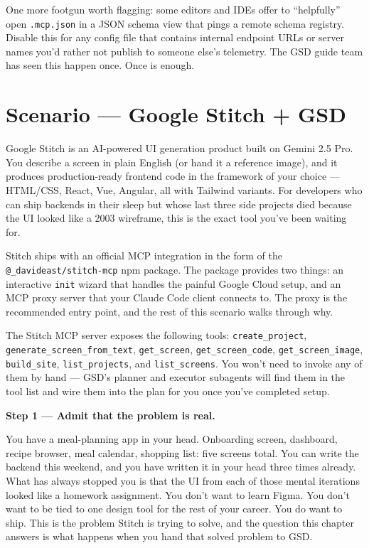 \documentclass[11pt,letterpaper,openany]{book}
\begin{document}
One more footgun worth flagging: some editors and IDEs offer to
``helpfully'' open \texttt{.mcp.json} in a JSON schema view that pings a
remote schema registry. Disable this for any config file that contains
internal endpoint URLs or server names you'd rather not publish to
someone else's telemetry. The GSD guide team has seen this happen once.
Once is enough.

\chapter{Scenario --- Google Stitch + GSD}

\begin{gsdscenario}

Google Stitch is an AI-powered UI generation product built on Gemini 2.5
Pro. You describe a screen in plain English (or hand it a reference
image), and it produces production-ready frontend code in the framework
of your choice --- HTML/CSS, React, Vue, Angular, all with Tailwind
variants. For developers who can ship backends in their sleep but whose
last three side projects died because the UI looked like a 2003
wireframe, this is the exact tool you've been waiting for.

Stitch ships with an official MCP integration in the form of the
\texttt{@\_davideast/stitch-mcp} npm package. The package provides two
things: an interactive \texttt{init} wizard that handles the painful
Google Cloud setup, and an MCP proxy server that your Claude Code
client connects to. The proxy is the recommended entry point, and the
rest of this scenario walks through why.

The Stitch MCP server exposes the following tools:
\texttt{create\_project}, \texttt{generate\_screen\_from\_text},
\texttt{get\_screen}, \texttt{get\_screen\_code},
\texttt{get\_screen\_image}, \texttt{build\_site},
\texttt{list\_projects}, and \texttt{list\_screens}. You won't need to
invoke any of them by hand --- GSD's planner and executor subagents
will find them in the tool list and wire them into the plan for you
once you've completed setup.

\vspace{6pt}
\textbf{Step 1 --- Admit that the problem is real.}
\vspace{4pt}

You have a meal-planning app in your head. Onboarding screen, dashboard,
recipe browser, meal calendar, shopping list: five screens total. You
can write the backend this weekend, and you have written it in your
head three times already. What has always stopped you is that the UI
from each of those mental iterations looked like a homework assignment.
You don't want to learn Figma. You don't want to be tied to one design
tool for the rest of your career. You do want to ship. This is the
problem Stitch is trying to solve, and the question this chapter
answers is what happens when you hand that solved problem to GSD.


\end{gsdscenario}
\end{document}
